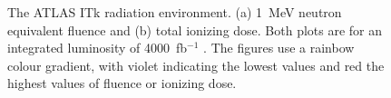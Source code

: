 \begin{figure}[ht]
\centering
{}\quad
{}
\caption{The ATLAS ITk radiation environment. (a) 1~MeV neutron equivalent fluence and (b) total ionizing dose. Both plots are for an integrated luminosity of 4000~fb$^{-1}$ \cite{background}.
The figures use a rainbow colour gradient, with violet indicating the lowest values and red the highest values of fluence or ionizing dose.
}
\label{fig:radiation}
\end{figure}

